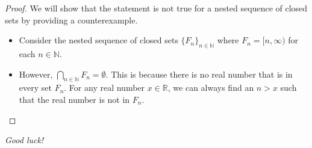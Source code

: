 \documentclass[10pt]{article}
\newcommand{\N}{\mathbb{N}}
\newcommand{\R}{\mathbb{R}}
\newenvironment{problem}[2][Problem]{\begin{trivlist}
\item[\hskip \labelsep {\bfseries #1}\hskip \labelsep {\bfseries #2.}]}{\end{trivlist}}
\begin{document}
\begin{problem}{5}
\begin{enumerate}
            \begin{proof}
                We will show that the statement is not true for a nested sequence of closed sets by providing a counterexample.
                \begin{itemize}
                    \item Consider the nested sequence of closed sets $\{F_n\}_{n \in \N}$ where $F_n = [n, \infty)$ for each $n \in \N$.
                    \item However, $\bigcap_{n \in \N} F_n = \emptyset$.
                        This is because there is no real number that is in every set $F_n$.
                        For any real number $x \in \R$, we can always find an $n > x$ such that the real number is not in $F_n$.
                \end{itemize}
            \end{proof}
	\end{enumerate}
\end{problem}

\vspace{3cm}\hfill \emph{Good luck!}
\end{document}
